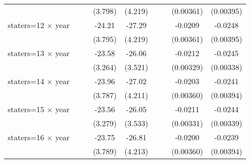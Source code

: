{\begin{longtable}{l*{8}{c}}
                    &                     &                     &     (3.798)         &     (4.219)         &                     &                     &   (0.00361)         &   (0.00395)         \\
[1em]
staters=12 $\times$ year&                     &                     &      -24.21\sym{***}&      -27.29\sym{***}&                     &                     &     -0.0209\sym{***}&     -0.0248\sym{***}\\
                    &                     &                     &     (3.795)         &     (4.219)         &                     &                     &   (0.00361)         &   (0.00395)         \\
[1em]
staters=13 $\times$ year&                     &                     &      -23.58\sym{***}&      -26.06\sym{***}&                     &                     &     -0.0212\sym{***}&     -0.0245\sym{***}\\
                    &                     &                     &     (3.264)         &     (3.521)         &                     &                     &   (0.00329)         &   (0.00338)         \\
[1em]
staters=14 $\times$ year&                     &                     &      -23.96\sym{***}&      -27.02\sym{***}&                     &                     &     -0.0203\sym{***}&     -0.0241\sym{***}\\
                    &                     &                     &     (3.787)         &     (4.211)         &                     &                     &   (0.00360)         &   (0.00394)         \\
[1em]
staters=15 $\times$ year&                     &                     &      -23.56\sym{***}&      -26.05\sym{***}&                     &                     &     -0.0211\sym{***}&     -0.0244\sym{***}\\
                    &                     &                     &     (3.279)         &     (3.533)         &                     &                     &   (0.00331)         &   (0.00339)         \\
[1em]
staters=16 $\times$ year&                     &                     &      -23.75\sym{***}&      -26.81\sym{***}&                     &                     &     -0.0200\sym{***}&     -0.0239\sym{***}\\
                    &                     &                     &     (3.789)         &     (4.213)         &                     &                     &   (0.00360)         &   (0.00394)         \\

\end{longtable}}
